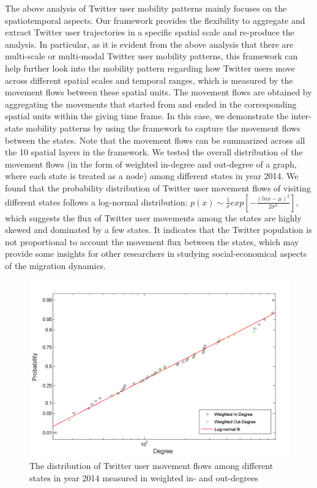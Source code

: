 \documentclass[ijgi,article,submit,moreauthors,pdftex,10pt,a4paper]{mdpi}
\theoremstyle{mdpi}
\newcounter{ex}
\newcounter{re}
\theoremstyle{mdpidefinition}
\begin{document}
The above analysis of Twitter user mobility patterns mainly focuses on the spatiotemporal aspects.
Our framework provides the flexibility to aggregate and extract Twitter user trajectories in a specific spatial scale and re-produce the analysis.
In particular, as it is evident from the above analysis that there are multi-scale or multi-modal Twitter user mobility patterns, this framework can help further look into the mobility pattern regarding how Twitter users move across different spatial scales and temporal ranges, which is measured by the movement flows between these spatial units.
The movement flows are obtained by aggregating the movements that started from and ended in the corresponding spatial units within the giving time frame.
In this case, we demonstrate the inter-state mobility patterns by using the framework to capture the movement flows between the states.
Note that the movement flows can be summarized across all the 10 spatial layers in the framework.
We tested the overall distribution of the movement flows (in the form of weighted in-degree and out-degree of a graph, where each state is treated as a node) among different states in year 2014.
We found that the probability distribution of Twitter user movement flows of visiting different states follows a log-normal distribution: $p(x)\sim \frac{1}{x}exp[-\frac{(lnx - \mu)^{2}}{2\sigma^{2}}]$, which suggests the flux of Twitter user movements among the states are highly skewed and dominated by a few states.
It indicates that the Twitter population is not proportional to account the movement flux between the states, which may provide some insights for other researchers in studying social-economical aspects of the migration dynamics.

\begin{figure}[ht]
\centering
\includegraphics[width=0.8\linewidth]{./figures/degree}
\caption{The distribution of Twitter user movement flows among different states in year 2014 measured in weighted in- and out-degrees}
\label{fig:state_flow}
\end{figure}
\FloatBarrier
\end{document}
